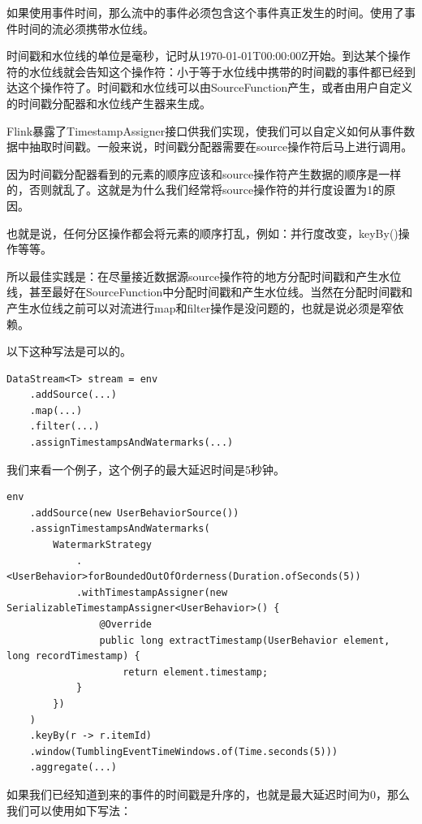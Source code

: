 \documentclass[cn,11pt,chinese]{elegantbook}
\begin{document}
如果使用事件时间，那么流中的事件必须包含这个事件真正发生的时间。使用了事件时间的流必须携带水位线。

时间戳和水位线的单位是毫秒，记时从1970-01-01T00:00:00Z开始。到达某个操作符的水位线就会告知这个操作符：小于等于水位线中携带的时间戳的事件都已经到达这个操作符了。时间戳和水位线可以由SourceFunction产生，或者由用户自定义的时间戳分配器和水位线产生器来生成。

Flink暴露了TimestampAssigner接口供我们实现，使我们可以自定义如何从事件数据中抽取时间戳。一般来说，时间戳分配器需要在source操作符后马上进行调用。

\begin{note}
    因为时间戳分配器看到的元素的顺序应该和source操作符产生数据的顺序是一样的，否则就乱了。这就是为什么我们经常将source操作符的并行度设置为1的原因。
\end{note}

也就是说，任何分区操作都会将元素的顺序打乱，例如：并行度改变，keyBy()操作等等。

所以最佳实践是：在尽量接近数据源source操作符的地方分配时间戳和产生水位线，甚至最好在SourceFunction中分配时间戳和产生水位线。当然在分配时间戳和产生水位线之前可以对流进行map和filter操作是没问题的，也就是说必须是窄依赖。

以下这种写法是可以的。

\begin{verbatim}
DataStream<T> stream = env
    .addSource(...)
    .map(...)
    .filter(...)
    .assignTimestampsAndWatermarks(...)
\end{verbatim}

我们来看一个例子，这个例子的最大延迟时间是5秒钟。

\begin{verbatim}
env
    .addSource(new UserBehaviorSource())
    .assignTimestampsAndWatermarks(
        WatermarkStrategy
            .<UserBehavior>forBoundedOutOfOrderness(Duration.ofSeconds(5))
            .withTimestampAssigner(new SerializableTimestampAssigner<UserBehavior>() {
                @Override
                public long extractTimestamp(UserBehavior element, long recordTimestamp) {
                    return element.timestamp;
            }
        })
    )
    .keyBy(r -> r.itemId)
    .window(TumblingEventTimeWindows.of(Time.seconds(5)))
    .aggregate(...)
\end{verbatim}

如果我们已经知道到来的事件的时间戳是升序的，也就是最大延迟时间为0，那么我们可以使用如下写法：
\end{document}
